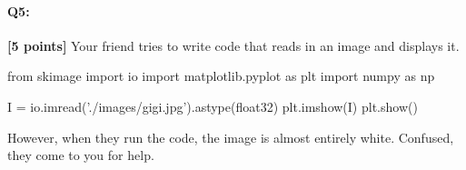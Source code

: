 \documentclass[11pt]{article}
\begin{document}
\begin{enumerate}[(a)]
\begin{enumerate}[(i)]

\end{enumerate}
\end{enumerate}


\pagebreak
    \paragraph{Q5:} \textbf{[5 points]} Your friend tries to write code that reads in an image and displays it. 
    
    \begin{python}
        from skimage import io
        import matplotlib.pyplot as plt
        import numpy as np

        I = io.imread('./images/gigi.jpg').astype(float32)
        plt.imshow(I)
        plt.show()
    \end{python}
    
    However, when they run the code, the image is almost entirely white. Confused, they come to you for help.
\end{document}
